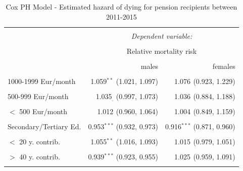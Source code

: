 \documentclass[a4paper,10pt,oneside,english]{article}
\begin{document}


\begin{table}[H] \centering 
	\caption{\textsf{Cox PH Model - Estimated hazard of dying for pension recipients between 2011-2015}}
	\label{} 
	\begin{tabular}{@{\extracolsep{5pt}}lrr} 
		\\[-1.8ex]\hline 
		\hline \\[-1.8ex] 
		& \multicolumn{2}{c}{\textit{Dependent variable:}} \\ 
		\cline{2-3} 
		\\[-1.8ex] & \multicolumn{2}{c}{Relative mortality risk} \\ 
		\\[-1.8ex] & males & females\\ 
		\hline \\[-1.8ex] 
		1000-1999  Eur/month & 1.059$^{**}$ (1.021, 1.097) & 1.076$^{}$ (0.923, 1.229) \\ 
		& & \\ 
		500-999 Eur/month & 1.035$_{.}$ (0.997, 1.073) & 1.036$^{}$ (0.884, 1.188) \\ 
		& & \\ 
		$<$ 500 Eur/month & 1.012$^{}$ (0.960, 1.064) & 1.004$^{}$ (0.849, 1.159) \\ 
		& & \\ 
		Secondary/Tertiary Ed. & 0.953$^{***}$ (0.932, 0.973) & 0.916$^{***}$ (0.871, 0.960) \\ 
		& & \\ 
		$<$ 20 y. contrib. & 1.055$^{**}$ (1.016, 1.093) & 1.015$^{}$ (0.979, 1.051) \\ 
		& & \\ 
		$>$ 40 y. contrib. & 0.939$^{***}$ (0.923, 0.955) & 1.025$^{}$ (0.959, 1.091) \\ 
		& & \\ 

\end{tabular}
\end{table}
\end{document}
